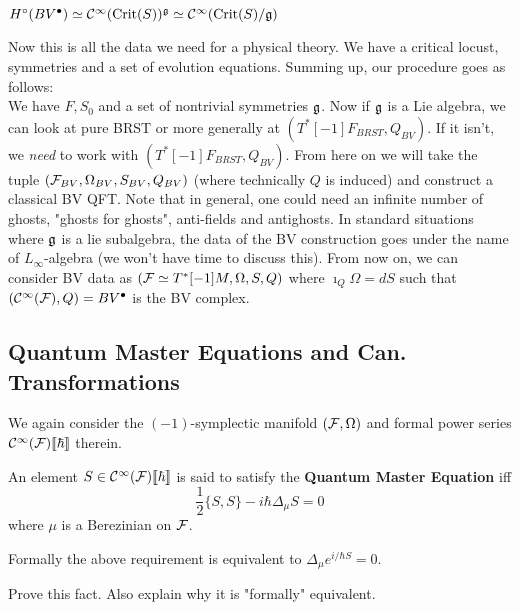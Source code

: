 \begin{corollary}
  $H^\circ(BV^\bullet) \simeq \mathcal{C}^{\infty}(\operatorname{Crit}(S))^{\mathfrak{g}} \simeq \mathcal{C}^{\infty}(\operatorname{Crit}(S)/\mathfrak{g})$
\end{corollary}

Now this is all the data we need for a physical theory. We have a critical locust, symmetries and a set of evolution equations. Summing up, our procedure goes as follows:\\

We have $F, S_0$ and a set of nontrivial symmetries $\mathfrak{g}$. Now if $\mathfrak{g}$ is a Lie algebra, we can look at pure BRST or more generally at $(T^*[-1]F_{BRST}, Q_{BV})$. If it isn't, we \emph{need} to work with $(T^*[-1]F_{BRST}, Q_{BV})$. From here on we will take the tuple $({\mathcal{F}}_{BV}, \Omega_{BV}, S_{BV}, Q_{BV})$ (where technically $Q$ is induced) and construct a classical BV QFT. Note that in general, one could need an infinite number of ghosts, "ghosts for ghosts", anti-fields and antighosts. In standard situations where $\mathfrak{g}$ is a lie subalgebra, the data of the BV construction goes under the name of $L_\infty$-algebra (we won't have time to discuss this). From now on, we can consider BV data as $({\mathcal{F}} \simeq T^*[-1]M, \Omega, S, Q)$ where $\imath_Q \Omega = dS$ such that $(\mathcal{C}^{\infty}({\mathcal{F}}), Q) = BV^\bullet$ is the BV complex.

\subsection{Quantum Master Equations and Can. Transformations}

We again consider the $(-1)$-symplectic manifold $({\mathcal{F}}, \Omega)$ and formal power series $\mathcal{C}^{\infty}({\mathcal{F}})\llbracket \hbar \rrbracket$ therein.

\begin{definition}
  An element $S \in \mathcal{C}^{\infty}({\mathcal{F}})\llbracket \hbar \rrbracket$ is said to satisfy the \textbf{Quantum Master Equation} iff
  \begin{equation} \tag{$QME$} \label{QME}
    \frac{1}{2} \{S,S\} - i \hbar \Delta_\mu S = 0
  \end{equation}
  where $\mu$ is a Berezinian on ${\mathcal{F}}$.
\end{definition}

Formally the above requirement is equivalent to $\Delta_\mu e^{i/\hbar S} = 0$.

\begin{ex}
  Prove this fact. Also explain why it is "formally" equivalent.
\end{ex}

